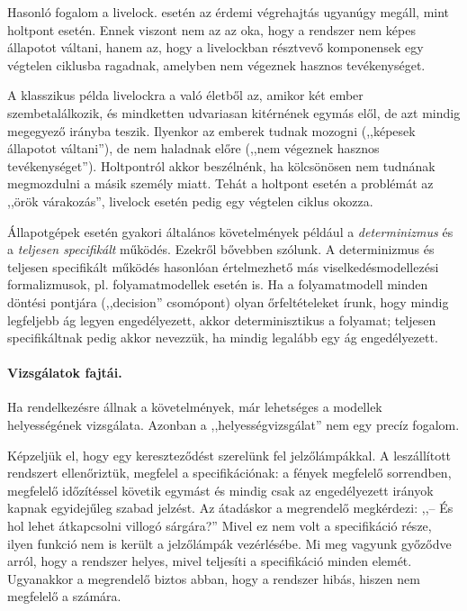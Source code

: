 Hasonló fogalom a livelock.  esetén az érdemi végrehajtás ugyanúgy megáll, mint holtpont esetén. Ennek viszont nem az az oka, hogy a rendszer nem képes állapotot váltani, hanem az, hogy a livelockban résztvevő komponensek egy végtelen ciklusba ragadnak, amelyben nem végeznek hasznos tevékenységet.

\begin{pelda}
A klasszikus példa livelockra a való életből az, amikor két ember szembetalálkozik, és mindketten udvariasan kitérnének egymás elől, de azt mindig megegyező irányba teszik. Ilyenkor az emberek tudnak mozogni (,,képesek állapotot váltani''), de nem haladnak előre (,,nem végeznek hasznos tevékenységet''). Holtpontról akkor beszélnénk, ha kölcsönösen nem tudnának megmozdulni a másik személy miatt. Tehát a holtpont esetén a problémát az ,,örök várakozás'', livelock esetén pedig egy végtelen ciklus okozza.
\end{pelda}

Állapotgépek esetén gyakori általános követelmények például a \emph{determinizmus} és a \emph{teljesen specifikált} működés. Ezekről bővebben  szólunk. A determinizmus és teljesen specifikált működés hasonlóan értelmezhető más viselkedésmodellezési formalizmusok, pl. folyamatmodellek esetén is. Ha a folyamatmodell minden döntési pontjára (,,decision'' csomópont) olyan őrfeltételeket írunk, hogy mindig legfeljebb ág legyen engedélyezett, akkor determinisztikus a folyamat; teljesen specifikáltnak pedig akkor nevezzük, ha mindig legalább egy ág engedélyezett.

\paragraph{Vizsgálatok fajtái.}
Ha rendelkezésre állnak a követelmények, már lehetséges a modellek helyességének vizsgálata. Azonban a ,,helyességvizsgálat'' nem egy precíz fogalom.

\begin{pelda}
Képzeljük el, hogy egy kereszteződést szerelünk fel jelzőlámpákkal. A leszállított rendszert ellenőriztük, megfelel a specifikációnak: a fények megfelelő sorrendben, megfelelő időzítéssel követik egymást és mindig csak az engedélyezett irányok kapnak egyidejűleg szabad jelzést. Az átadáskor a megrendelő megkérdezi: ,,-- És hol lehet átkapcsolni villogó sárgára?'' Mivel ez nem volt a specifikáció része, ilyen funkció nem is került a jelzőlámpák vezérlésébe. Mi meg vagyunk győződve arról, hogy a rendszer helyes, mivel teljesíti a specifikáció minden elemét. Ugyanakkor a megrendelő biztos abban, hogy a rendszer hibás, hiszen nem megfelelő a számára.
\end{pelda}


